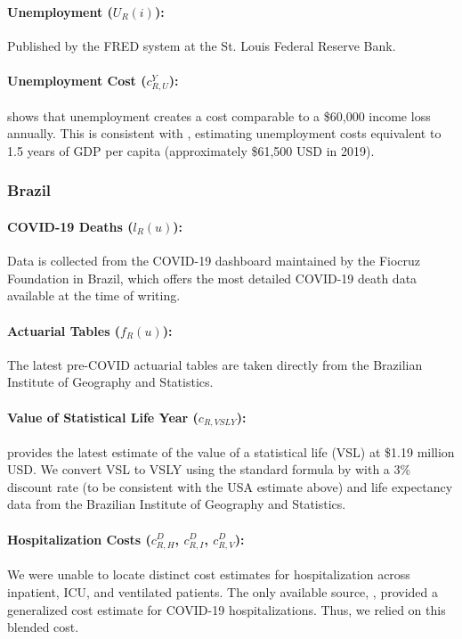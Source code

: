\documentclass[msom,blindrev]{informs3} %
\begin{document}
\begin{APPENDICES}
\paragraph{Unemployment ($U_R(i)$):} Published by the FRED system at the St. Louis Federal Reserve Bank.

\paragraph{Unemployment Cost ($c^Y_{R,U}$):}  shows that unemployment creates a cost comparable to a \$60,000 income loss annually. This is consistent with , estimating unemployment costs equivalent to 1.5 years of GDP per capita (approximately \$61,500 USD in 2019).




\subsubsection{Brazil}
\paragraph{COVID-19 Deaths ($l_R(u)$):} Data is collected from the COVID-19 dashboard maintained by the Fiocruz Foundation in Brazil, which offers the most detailed COVID-19 death data available at the time of writing.
\paragraph{Actuarial Tables ($f_R(u)$):} The latest pre-COVID actuarial tables are taken directly from the Brazilian Institute of Geography and Statistics.
\paragraph{Value of Statistical Life Year ($c_{R,VSLY}$):}  provides the latest estimate of the value of a statistical life (VSL) at \$1.19 million USD. We convert VSL to VSLY using the standard formula by  with a 3\% discount rate (to be consistent with the USA estimate above) and life expectancy data from the Brazilian Institute of Geography and Statistics.
\paragraph{Hospitalization Costs ($c^D_{R,H}$, $c^D_{R,I}$, $c^D_{R,V}$):} We were unable to locate distinct cost estimates for hospitalization across inpatient, ICU, and ventilated patients. The only available source, , provided a generalized cost estimate for COVID-19 hospitalizations. Thus, we relied on this blended cost.

\end{APPENDICES}
\end{document}
